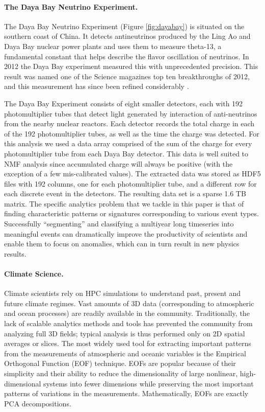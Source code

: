\paragraph{The Daya Bay Neutrino Experiment.}
The Daya Bay Neutrino Experiment (Figure \ref{fig:dayabay}) is situated on the southern coast of China. It detects antineutrinos produced by the Ling Ao and Daya Bay nuclear power plants and uses them to measure theta-13, a fundamental constant that helps describe the flavor oscillation of neutrinos. In 2012 the Daya Bay experiment measured this with unprecedented precision. This result was named one of the Science magazines top ten breakthroughs of 2012, and this measurement has since been refined considerably \cite{dayabay15}.

The Daya Bay Experiment consists of eight smaller detectors, each with 192 photomultiplier tubes that detect light generated by interaction of anti-neutrinos from the nearby nuclear reactors. Each detector records the total charge in each of the 192 photomultiplier tubes, as well as the time the charge was detected. For this analysis we used a data array comprised of the sum of the charge for every photomultiplier tube from each Daya Bay detector. This data is well suited to NMF analysis since accumulated charge will always be positive (with the exception of a few mis-calibrated values). The extracted data was stored as HDF5 files with 192 columns, one for each photomultiplier tube, and a different row for each discrete event in the detectors. The resulting data set is a sparse 1.6 TB matrix. The specific analytics problem that we tackle in this paper is that of finding characteristic patterns or signatures corresponding to various event types. Successfully ``segmenting'' and classifying a multiyear long timeseries into meaningful events can dramatically improve the productivity of scientists and enable them to focus on anomalies, which can in turn result in new physics results.

\paragraph{Climate Science.}
Climate scientists rely on HPC simulations to understand past, present and future climate regimes. Vast amounts of 3D data (corresponding to atmospheric and ocean processes) are readily available in the community. Traditionally, the lack of scalable analytics methods and tools has prevented the community from analyzing full 3D fields; typical analysis is thus performed only on 2D spatial averages or slices. The most widely used tool for extracting important patterns from the measurements of atmospheric and oceanic variables is the Empirical Orthogonal Function (EOF) technique. EOFs are popular because of their simplicity and their ability to reduce the dimensionality of large nonlinear, high-dimensional systems into fewer dimensions while preserving the most important patterns of variations in the measurements. Mathematically, EOFs are exactly PCA decompositions.

